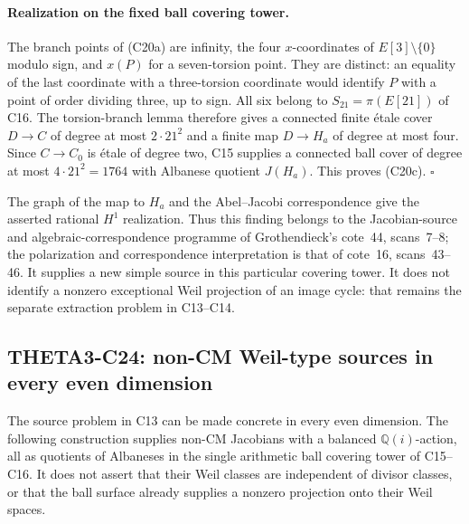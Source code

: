 \documentclass[11pt]{article}
\newcommand{\Q}{\mathbb Q}\newcommand{\C}{\mathbb C}\newcommand{\Z}{\mathbb Z}\newcommand{\R}{\mathbb R}\newcommand{\A}{\mathbb A}\newcommand{\OO}{\mathcal O}
\theoremstyle{definition}\newtheorem{definition}[theorem]{Definition}\newtheorem{remark}[theorem]{Remark}
\begin{document}
\paragraph{Realization on the fixed ball covering tower.}
The branch points of (C20a) are infinity, the four
$x$-coordinates of $E[3]\setminus\{0\}$ modulo sign,
and $x(P)$ for a seven-torsion point. They are distinct:
an equality of the last coordinate with a three-torsion
coordinate would identify $P$ with a point of order
dividing three, up to sign. All six belong to
$S_{21}=\pi(E[21])$ of C16. The torsion-branch lemma
therefore gives a connected finite \'etale cover
$D\to C$ of degree at most $2\cdot21^2$ and a finite
map $D\to H_a$ of degree at most four. Since
$C\to C_0$ is \'etale of degree two, C15 supplies
a connected ball cover of degree at most
$4\cdot21^2=1764$ with Albanese quotient $J(H_a)$.
This proves (C20c). \hfill$\square$

The graph of the map to $H_a$ and the Abel--Jacobi
correspondence give the asserted rational $H^1$
realization. Thus this finding belongs to the
Jacobian-source and algebraic-correspondence programme
of Grothendieck's cote~44, scans~7--8; the
polarization and correspondence interpretation is
that of cote~16, scans~43--46. It supplies a new
simple source in this particular covering tower.
It does not identify a nonzero exceptional Weil
projection of an image cycle: that remains the
separate extraction problem in C13--C14.


\subsection{THETA3-C24: non-CM Weil-type sources in every even dimension}\label{C24}

The source problem in C13 can be made concrete in every even dimension.
The following construction supplies non-CM Jacobians with a balanced
$\Q(i)$-action, all as quotients of Albaneses in the single arithmetic
ball covering tower of C15--C16. It does not assert that their Weil
classes are independent of divisor classes, or that the ball surface
already supplies a nonzero projection onto their Weil spaces.
\end{document}
